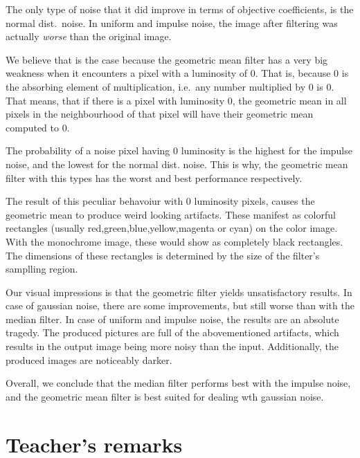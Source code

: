 \documentclass[12pt]{article}
\theoremstyle{definition}
\begin{document}
The only type of noise that it did improve in terms of objective coefficients, is the normal dist.\ noise.
In uniform and impulse noise, the image after filtering was actually \emph{worse} than the original image.

We believe that is the case because the geometric mean filter has a very big weakness when it encounters a pixel with a luminosity of 0.
That is, because 0 is the absorbing element of multiplication, i.e.\ any number multiplied by 0 is 0.
That means, that if there is a pixel with luminosity 0, the geometric mean in all pixels in the neighbourhood of that pixel will have their geometric mean computed to 0.

The probability of a noise pixel having 0 luminosity is the highest for the impulse noise,
and the lowest for the normal dist. noise.
This is why, the geometric mean filter with this types has the worst and best performance respectively.

The result of this peculiar behavoiur with 0 luminosity pixels, causes the geometric mean to produce weird looking artifacts.
These manifest as colorful rectangles (usually red,green,blue,yellow,magenta or cyan) on the color image.
With the monochrome image,
these would show as completely black rectangles.
The dimensions of these rectangles is determined by the size of the filter's samplling region.

Our visual impressions is that the geometric filter yields unsatisfactory results.
In case of gaussian noise, there are some improvements, but still worse than with the median filter.
In case of uniform and impulse noise, the results are an absolute tragedy. The produced pictures are full of the abovementioned artifacts,
which results in the output image being more noisy than the input.
Additionally, the produced images are noticeably darker.

Overall, we conclude that the median filter performs best with the impulse noise, and the geometric mean filter is best suited for dealing wth gaussian noise.

\clearpage
\vfill
\section*{Teacher's remarks}
\begin{tabularx}{\textwidth}{|X|}
    \hline
    \vspace{7cm}
    \phantom{.} \\
    \hline
\end{tabularx}
\end{document}

